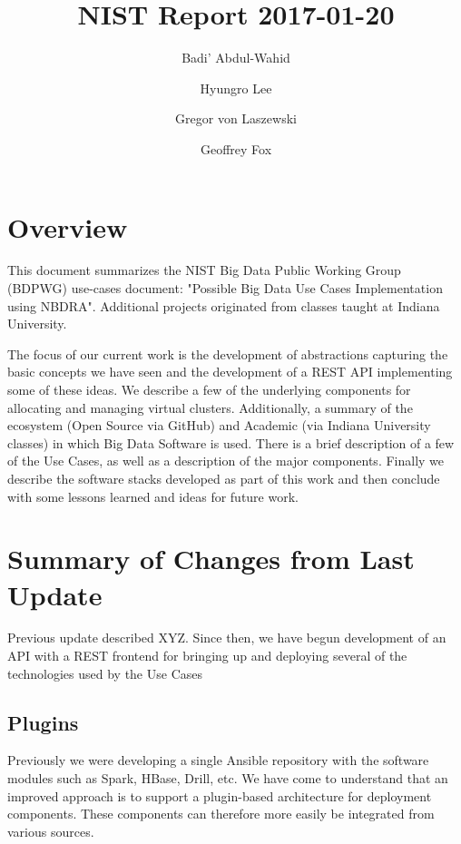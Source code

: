 \documentclass[9pt,twocolumn,twoside]{styles/osajnl}
\title{NIST Report 2017-01-20}
\author[1]{Badi' Abdul-Wahid}
\author[1]{Hyungro Lee}
\author[1]{Gregor von Laszewski}
\author[1,*]{Geoffrey Fox}
\affil[1]{School of Informatics and Computing, Bloomington, IN 47408, U.S.A.}
\affil[*]{Corresponding authors: gcf@indiana.edu}
\begin{document}
\maketitle



\section{Overview}

This document summarizes the NIST Big Data Public Working Group
(BDPWG) use-cases document: "Possible Big Data Use Cases
Implementation using NBDRA". Additional projects originated from
classes taught at Indiana University.


The focus of our current work is the development of abstractions
capturing the basic concepts we have seen and the development of a
REST API implementing some of these ideas. We describe a few of the
underlying components for allocating and managing virtual
clusters. Additionally, a summary of the ecosystem (Open Source via
GitHub) and Academic (via Indiana University classes) in which Big
Data Software is used. There is a brief description of a few of the
Use Cases, as well as a description of the major components. Finally
we describe the software stacks developed as part of this work and
then conclude with some lessons learned and ideas for future work.



\section{Summary of Changes from Last Update}

Previous update described XYZ.
Since then, we have begun development of an API with a REST frontend for bringing up and deploying several of the technologies used by the Use Cases



\subsection{Plugins}

Previously we were developing a single Ansible repository with the software modules such as Spark, HBase, Drill, etc. We have come to understand that an improved approach is to support a plugin-based architecture for deployment components. These components can therefore more easily be integrated from various sources.
\end{document}
